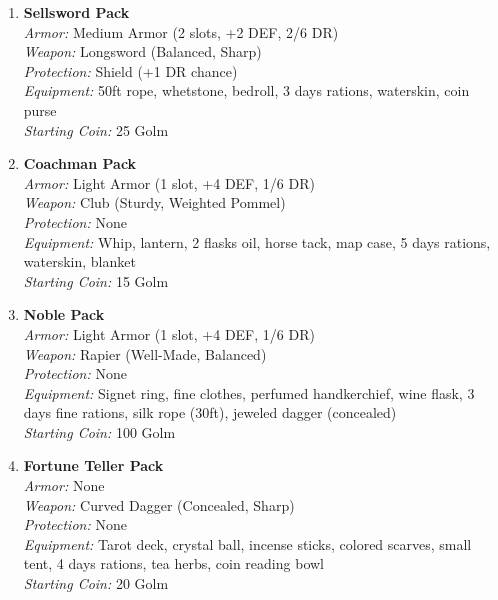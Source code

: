 \documentclass[10pt,twoside]{article}
\begin{document}
\begin{multicols}{2}
\begin{enumerate}
    \item \textcolor{packcolor}{\textbf{Sellsword Pack}} \\
    \textit{Armor:} Medium Armor (2 slots, +2 DEF, 2/6 DR) \\
    \textit{Weapon:} Longsword (Balanced, Sharp) \\
    \textit{Protection:} Shield (+1 DR chance) \\
    \textit{Equipment:} 50ft rope, whetstone, bedroll, 3 days rations, waterskin, coin purse \\
    \textit{Starting Coin:} 25 Golm
    
    \item \textcolor{packcolor}{\textbf{Coachman Pack}} \\
    \textit{Armor:} Light Armor (1 slot, +4 DEF, 1/6 DR) \\
    \textit{Weapon:} Club (Sturdy, Weighted Pommel) \\
    \textit{Protection:} None \\
    \textit{Equipment:} Whip, lantern, 2 flasks oil, horse tack, map case, 5 days rations, waterskin, blanket \\
    \textit{Starting Coin:} 15 Golm
    
    \item \textcolor{packcolor}{\textbf{Noble Pack}} \\
    \textit{Armor:} Light Armor (1 slot, +4 DEF, 1/6 DR) \\
    \textit{Weapon:} Rapier (Well-Made, Balanced) \\
    \textit{Protection:} None \\
    \textit{Equipment:} Signet ring, fine clothes, perfumed handkerchief, wine flask, 3 days fine rations, silk rope (30ft), jeweled dagger (concealed) \\
    \textit{Starting Coin:} 100 Golm
    
    \item \textcolor{packcolor}{\textbf{Fortune Teller Pack}} \\
    \textit{Armor:} None \\
    \textit{Weapon:} Curved Dagger (Concealed, Sharp) \\
    \textit{Protection:} None \\
    \textit{Equipment:} Tarot deck, crystal ball, incense sticks, colored scarves, small tent, 4 days rations, tea herbs, coin reading bowl \\
    \textit{Starting Coin:} 20 Golm
    

\end{enumerate}
\end{multicols}
\end{document}
